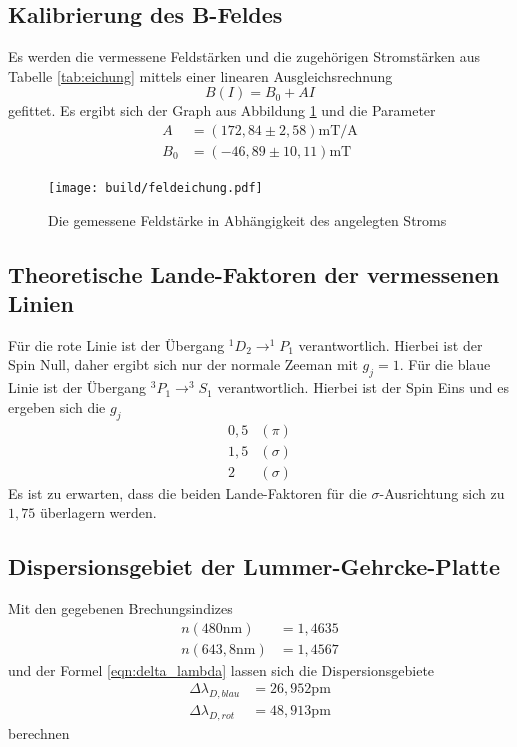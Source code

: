 \subsection{Kalibrierung des B-Feldes}
Es werden die vermessene Feldstärken und die zugehörigen Stromstärken aus Tabelle \ref{tab:eichung} mittels einer linearen Ausgleichsrechnung
\begin{equation}
  B(I) = B_0 + AI
\end{equation}
gefittet. Es ergibt sich der Graph aus Abbildung \ref{fig:eichung} und die Parameter
\begin{align}
  A &= (172,84 \pm 2,58)\si{\milli\tesla\per\ampere}\nonumber\\
  B_0 &= (-46,89 \pm 10,11)\si{\milli\tesla}
\end{align}

\begin{figure}
  \centering
  \texttt{[image: build/feldeichung.pdf]}
  \caption{Die gemessene Feldstärke in Abhängigkeit des angelegten Stroms}
  \label{fig:eichung}
\end{figure}
\subsection{Theoretische Lande-Faktoren der vermessenen Linien}
Für die rote Linie ist der Übergang $^1D_2\rightarrow ^1P_1$ verantwortlich.
Hierbei ist der Spin Null, daher ergibt sich nur der normale Zeeman mit $g_j=1$.
Für die blaue Linie ist der Übergang $^3P_1\rightarrow ^3S_1$ verantwortlich.
Hierbei ist der Spin Eins und es ergeben sich die $g_j$
\begin{align}
  0,5&(\pi)\nonumber\\
  1,5&(\sigma)\nonumber\\
  2&(\sigma)
\end{align}
Es ist zu erwarten, dass die beiden Lande-Faktoren für die $\sigma$-Ausrichtung sich zu $1,75$ überlagern werden.

\subsection{Dispersionsgebiet der Lummer-Gehrcke-Platte}
Mit den gegebenen Brechungsindizes
\begin{align}
  n(480\si{\nano\meter})&=1,4635\nonumber\\
  n(643,8\si{\nano\meter})&=1,4567
\end{align}
und der Formel \eqref{eqn:delta_lambda} lassen sich die Dispersionsgebiete
\begin{align}
  \Delta \lambda_{D,blau} &= 26,952\si{\pico\meter}\nonumber\\
  \Delta \lambda_{D,rot}  &= 48,913\si{\pico\meter}
  \label{eqn:dispersion}
\end{align}
berechnen

